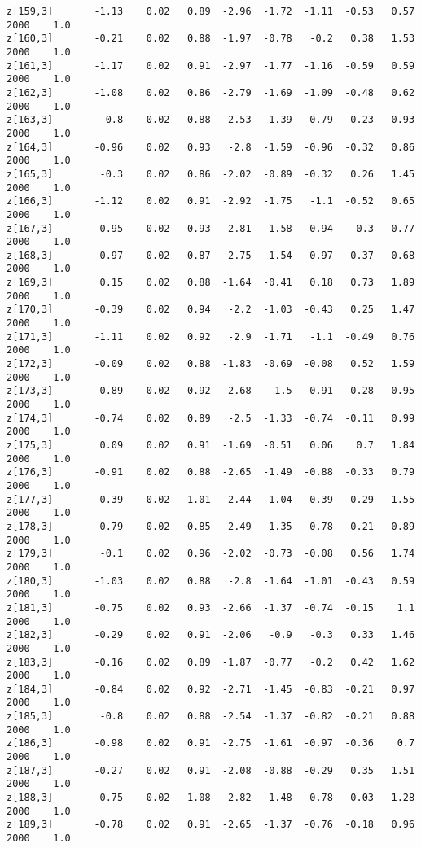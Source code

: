 \documentclass[11pt]{article}
\begin{document}
\begin{Verbatim}[commandchars=\\\{\}]
z[159,3]       -1.13    0.02   0.89  -2.96  -1.72  -1.11  -0.53   0.57   2000    1.0
z[160,3]       -0.21    0.02   0.88  -1.97  -0.78   -0.2   0.38   1.53   2000    1.0
z[161,3]       -1.17    0.02   0.91  -2.97  -1.77  -1.16  -0.59   0.59   2000    1.0
z[162,3]       -1.08    0.02   0.86  -2.79  -1.69  -1.09  -0.48   0.62   2000    1.0
z[163,3]        -0.8    0.02   0.88  -2.53  -1.39  -0.79  -0.23   0.93   2000    1.0
z[164,3]       -0.96    0.02   0.93   -2.8  -1.59  -0.96  -0.32   0.86   2000    1.0
z[165,3]        -0.3    0.02   0.86  -2.02  -0.89  -0.32   0.26   1.45   2000    1.0
z[166,3]       -1.12    0.02   0.91  -2.92  -1.75   -1.1  -0.52   0.65   2000    1.0
z[167,3]       -0.95    0.02   0.93  -2.81  -1.58  -0.94   -0.3   0.77   2000    1.0
z[168,3]       -0.97    0.02   0.87  -2.75  -1.54  -0.97  -0.37   0.68   2000    1.0
z[169,3]        0.15    0.02   0.88  -1.64  -0.41   0.18   0.73   1.89   2000    1.0
z[170,3]       -0.39    0.02   0.94   -2.2  -1.03  -0.43   0.25   1.47   2000    1.0
z[171,3]       -1.11    0.02   0.92   -2.9  -1.71   -1.1  -0.49   0.76   2000    1.0
z[172,3]       -0.09    0.02   0.88  -1.83  -0.69  -0.08   0.52   1.59   2000    1.0
z[173,3]       -0.89    0.02   0.92  -2.68   -1.5  -0.91  -0.28   0.95   2000    1.0
z[174,3]       -0.74    0.02   0.89   -2.5  -1.33  -0.74  -0.11   0.99   2000    1.0
z[175,3]        0.09    0.02   0.91  -1.69  -0.51   0.06    0.7   1.84   2000    1.0
z[176,3]       -0.91    0.02   0.88  -2.65  -1.49  -0.88  -0.33   0.79   2000    1.0
z[177,3]       -0.39    0.02   1.01  -2.44  -1.04  -0.39   0.29   1.55   2000    1.0
z[178,3]       -0.79    0.02   0.85  -2.49  -1.35  -0.78  -0.21   0.89   2000    1.0
z[179,3]        -0.1    0.02   0.96  -2.02  -0.73  -0.08   0.56   1.74   2000    1.0
z[180,3]       -1.03    0.02   0.88   -2.8  -1.64  -1.01  -0.43   0.59   2000    1.0
z[181,3]       -0.75    0.02   0.93  -2.66  -1.37  -0.74  -0.15    1.1   2000    1.0
z[182,3]       -0.29    0.02   0.91  -2.06   -0.9   -0.3   0.33   1.46   2000    1.0
z[183,3]       -0.16    0.02   0.89  -1.87  -0.77   -0.2   0.42   1.62   2000    1.0
z[184,3]       -0.84    0.02   0.92  -2.71  -1.45  -0.83  -0.21   0.97   2000    1.0
z[185,3]        -0.8    0.02   0.88  -2.54  -1.37  -0.82  -0.21   0.88   2000    1.0
z[186,3]       -0.98    0.02   0.91  -2.75  -1.61  -0.97  -0.36    0.7   2000    1.0
z[187,3]       -0.27    0.02   0.91  -2.08  -0.88  -0.29   0.35   1.51   2000    1.0
z[188,3]       -0.75    0.02   1.08  -2.82  -1.48  -0.78  -0.03   1.28   2000    1.0
z[189,3]       -0.78    0.02   0.91  -2.65  -1.37  -0.76  -0.18   0.96   2000    1.0

\end{Verbatim}
\end{document}
